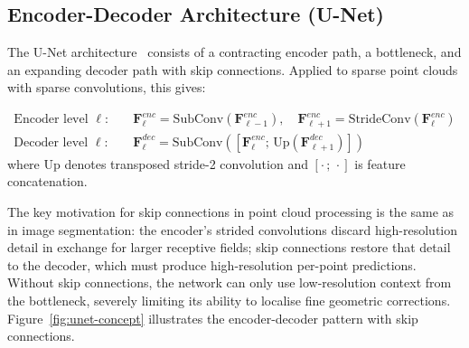 \subsection{Encoder-Decoder Architecture (U-Net)}
\label{ssec:unet-theory}

The U-Net architecture~\cite{ronneberger2015unet} consists of a contracting
encoder path, a bottleneck, and an expanding decoder path with skip connections.
Applied to sparse point clouds with sparse convolutions, this gives:

\begin{align}
  \text{Encoder level } \ell: &\quad
    \mathbf{F}^{enc}_\ell = \text{SubConv}(\mathbf{F}^{enc}_{\ell-1}),
    \quad \mathbf{F}^{enc}_{\ell+1} = \text{StrideConv}(\mathbf{F}^{enc}_\ell) \\
  \text{Decoder level } \ell: &\quad
    \mathbf{F}^{dec}_\ell = \text{SubConv}([\mathbf{F}^{enc}_\ell;\, \text{Up}(\mathbf{F}^{dec}_{\ell+1})])
\end{align}
where $\text{Up}$ denotes transposed stride-2 convolution and $[\cdot\,;\,\cdot]$
is feature concatenation.

The key motivation for skip connections in point cloud processing is the same
as in image segmentation: the encoder's strided convolutions discard
high-resolution detail in exchange for larger receptive fields; skip connections
restore that detail to the decoder, which must produce high-resolution
per-point predictions.
Without skip connections, the network can only use low-resolution context
from the bottleneck, severely limiting its ability to localise fine geometric
corrections.
Figure~\ref{fig:unet-concept} illustrates the encoder-decoder pattern with
skip connections.

